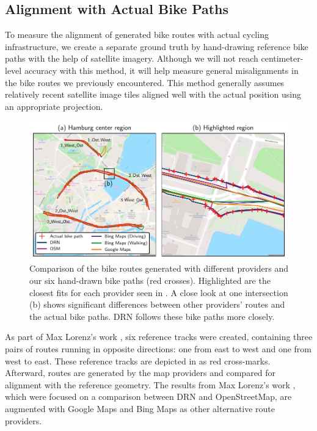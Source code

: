 \subsection{Alignment with Actual Bike Paths}\label{sec:routing-alignment}\label{sec:lorenz3}

To measure the alignment of generated bike routes with actual cycling infrastructure, we create a separate ground truth by hand-drawing reference bike paths with the help of satellite imagery. Although we will not reach centimeter-level accuracy with this method, it will help measure general misalignments in the bike routes we previously encountered. This method generally assumes relatively recent satellite image tiles aligned well with the actual position using an appropriate projection.

\begin{figure}[t]
\centering 
\includegraphics[width=\linewidth]{images/routing-hand-drawn-ground-truth.pdf}
\caption{Comparison of the bike routes generated with different providers and our six hand-drawn bike paths (red crosses). Highlighted are the closest fits for each provider seen in . A close look at one intersection (b) shows significant differences between other providers' routes and the actual bike paths. DRN follows these bike paths more closely.}
\label{fig:routing-hand-drawn-ground-truth}
\end{figure}

As part of Max Lorenz's work \cite{lorenz_2022}, six reference tracks were created, containing three pairs of routes running in opposite directions: one from east to west and one from west to east. These reference tracks are depicted in  as red cross-marks. Afterward, routes are generated by the map providers and compared for alignment with the reference geometry. The results from Max Lorenz's work \cite{lorenz_2022}, which were focused on a comparison between DRN and OpenStreetMap, are augmented with Google Maps and Bing Maps as other alternative route providers.

